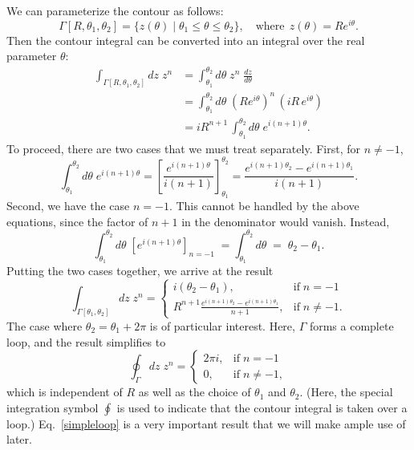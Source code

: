 \documentclass[10pt,a4paper]{article}
\begin{document}
\noindent
We can parameterize the contour as follows:
\begin{equation}
\Gamma[R, \theta_1,\theta_2] = \big\{z(\theta) \;\big|\; \theta_1 \le \theta \le \theta_2\big\}, \quad \mathrm{where}\;\, z(\theta) = R e^{i\theta}.
\end{equation}
Then the contour integral can be converted into an integral over the
real parameter $\theta$:
\begin{align}
  \int_{\Gamma[R, \theta_1,\theta_2]} dz\; z^n &= \int_{\theta_1}^{\theta_2}  d\theta \; z^n \; \frac{dz}{d\theta} \\
  &= \int_{\theta_1}^{\theta_2}  d\theta \; \left( Re^{i\theta}\right)^n\, \left(iR\, e^{i\theta}\right) \\
  &= i R^{n+1} \, \int_{\theta_1}^{\theta_2}  d\theta \; e^{i(n+1)\theta}.
\end{align}
To proceed, there are two cases that we must treat separately. First,
for $n \ne -1$,
\begin{equation}
\int_{\theta_1}^{\theta_2} d\theta \; e^{i(n+1)\theta} = \left[\frac{e^{i(n+1)\theta}}{i(n+1)}\right]_{\theta_1}^{\theta_2} = \frac{e^{i(n+1)\theta_2} - e^{i(n+1)\theta_1}}{i(n+1)}.
\end{equation}
Second, we have the case $n = -1$. This cannot be handled by the above
equations, since the factor of $n + 1$ in the denominator would
vanish. Instead,
\begin{equation}
\int_{\theta_1}^{\theta_2} d\theta \; \left[e^{i(n+1)\theta} \right]_{n=-1} \; = \int_{\theta_1}^{\theta_2} d\theta \;=\; \theta_2 - \theta_1.
\end{equation}
Putting the two cases together, we arrive at the result
\begin{equation}
\int_{\Gamma[\theta_1,\theta_2]} dz\; z^n = \left\{\begin{array}{ll}i(\theta_2 - \theta_1), & \mathrm{if}\;n = -1 \\ \displaystyle R^{n+1}\frac{e^{i(n+1)\theta_2} - e^{i(n+1)\theta_1}}{n+1},&\mathrm{if}\;n\ne -1.\end{array}\right.
\label{arcresult}
\end{equation}
The case where $\theta_2 = \theta_1 + 2\pi$ is of particular interest.
Here, $\Gamma$ forms a complete loop, and the result simplifies to
\begin{equation}
  \oint_{\Gamma} dz\; z^n = \left\{\begin{array}{ll}2\pi i, & \mathrm{if}\;n = -1 \\ \displaystyle 0,&\mathrm{if}\;n\ne -1,\end{array}\right.
  \label{simpleloop}
\end{equation}
which is independent of $R$ as well as the choice of $\theta_1$ and
$\theta_2$. (Here, the special integration symbol $\oint$ is used to
indicate that the contour integral is taken over a loop.)
Eq.~\eqref{simpleloop} is a very important result that we will make
ample use of later.
\end{document}
